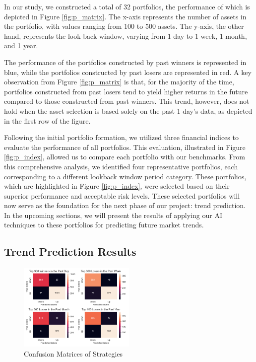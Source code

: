 \documentclass[journal]{IEEEtran}
\begin{document}
 In our study, we constructed a total of 32 portfolios, the performance of which is depicted in Figure \ref{fig:p_matrix}. The x-axis represents the number of assets in the portfolio, with values ranging from 100 to 500 assets. The y-axis, the other hand, represents the look-back window, varying from 1 day to 1 week, 1 month, and 1 year.

The performance of the portfolios constructed by past winners is represented in blue, while the portfolios constructed by past losers are represented in red. A key observation from Figure \ref{fig:p_matrix} is that, for the majority of the time, portfolios constructed from past losers tend to yield higher returns in the future compared to those constructed from past winners. This trend, however, does not hold when the asset selection is based solely on the past 1 day’s data, as depicted in the first row of the figure.

Following the initial portfolio formation, we utilized three financial indices to evaluate the performance of all portfolios. This evaluation, illustrated in Figure \ref{fig:p_index}, allowed us to compare each portfolio with our benchmarks. From this comprehensive analysis, we identified four representative portfolios, each corresponding to a different lookback window period category. These portfolios, which are highlighted in Figure \ref{fig:p_index}, were selected based on their superior performance and acceptable risk levels. These selected portfolios will now serve as the foundation for the next phase of our project: trend prediction. In the upcoming sections, we will present the results of applying our AI techniques to these portfolios for predicting future market trends.

\subsection{Trend Prediction Results}


\begin{figure}[h]
\centering
\includegraphics[width=0.5\textwidth]{tex/images/conf-mat.png}
\caption{Confusion Matrices of Strategies}
\label{fig:cof_matrix}
\end{figure}
\end{document}
